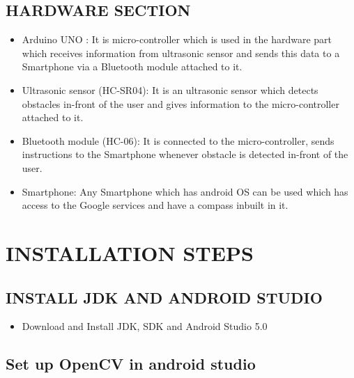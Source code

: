 \documentclass[11pt,a4paper,twoside]{report}
\begin{document}
\section{HARDWARE SECTION}
\begin{itemize}
\item Arduino UNO : It is micro-controller which is used in the hardware part which
receives information from ultrasonic sensor and sends this data to a Smartphone
via a Bluetooth module attached to it.
\item Ultrasonic sensor (HC-SR04): It is an ultrasonic sensor which detects obstacles
in-front of the user and gives information to the micro-controller attached to it.
\item Bluetooth module (HC-06): It is connected to the micro-controller, sends instructions
to the Smartphone whenever obstacle is detected in-front of the user.
\item Smartphone: Any Smartphone which has android OS can be used which has access
to the Google services and have a compass inbuilt in it.


\end{itemize}
\chapter{INSTALLATION STEPS}
\section{INSTALL JDK AND ANDROID STUDIO}
\begin{itemize}
\item Download and Install JDK, SDK and Android Studio 5.0
\end{itemize}
\section{Set up OpenCV in android studio}
\end{document}
